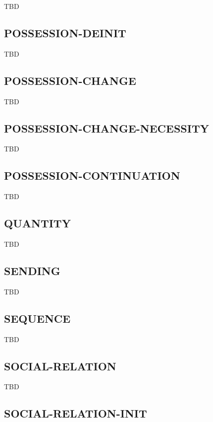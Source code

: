 \documentclass[a4paper]{article}
\newcommand{\fr}[1]{\textsf{#1}}
\begin{document}
TBD

\subsection{\fr{POSSESSION-DEINIT}}
\label{sec:POSSESSION-DEINIT}

TBD

\subsection{\fr{POSSESSION-CHANGE}}
\label{sec:POSSESSION-CHANGE}

TBD

\subsection{\fr{POSSESSION-CHANGE-NECESSITY}}
\label{sec:POSSESSION-CHANGE-NECESSITY}

TBD

\subsection{\fr{POSSESSION-CONTINUATION}}
\label{sec:POSSESSION-CONTINUATION}

TBD

\subsection{\fr{QUANTITY}}
\label{sec:QUANTITY}

TBD

\subsection{\fr{SENDING}}
\label{sec:SENDING}

TBD

\subsection{\fr{SEQUENCE}}
\label{sec:SEQUENCE}

TBD

\subsection{\fr{SOCIAL-RELATION}}
\label{sec:SOCIAL-RELATION}

TBD

\subsection{\fr{SOCIAL-RELATION-INIT}}
\label{sec:SOCIAL-RELATION-INIT}
\end{document}
